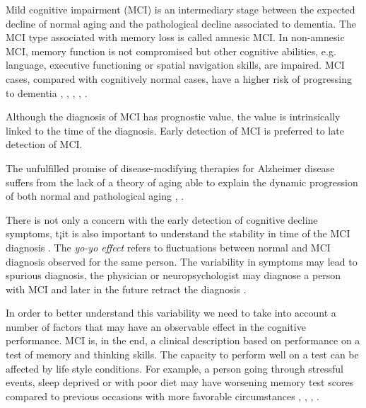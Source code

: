 \documentclass[preprint,12pt]{elsarticle}
\begin{document}
Mild cognitive impairment (MCI) is an intermediary stage between the expected decline of normal aging and the pathological decline associated to dementia. The MCI type associated with memory loss is called amnesic MCI. In non-amnesic MCI, memory function is not compromised but other cognitive abilities, e.g. language, executive functioning or spatial navigation skills, are impaired. MCI cases, compared with cognitively normal cases, have a higher risk of progressing to dementia \cite{flicker1991mild}, \cite{petersen1999mild}, \cite{bruscoli2004mci}, \cite{buratti2015markers}, \cite{michaud2017risk}.  
    
Although the diagnosis of MCI has prognostic value, the value is intrinsically linked to the time of the diagnosis. Early detection of MCI is preferred to late detection of MCI. 

The unfulfilled promise of disease-modifying therapies for Alzheimer disease suffers from the lack of a theory of aging able to explain the dynamic progression of both normal and pathological aging \cite{cerella1985information}, \cite{sleimen2014aging}. %

There is not only a concern with the early detection of cognitive decline symptoms, t¡it is also important to understand the stability in time of the MCI diagnosis \cite{}. The \emph{yo-yo effect} refers to fluctuations between normal and MCI diagnosis observed for the same person. The variability in symptoms may lead to spurious diagnosis, the physician or neuropsychologist may diagnose a person with MCI and later in the future retract the diagnosis \cite{https://www.ncbi.nlm.nih.gov/pubmed/24353338}. 

In order to better understand this variability we need to take into account a number of factors that may have an observable effect in the cognitive performance. MCI is, in the end, a clinical description based on performance on a test of memory and thinking skills. The capacity to perform well on a test can be affected by life style conditions. For example, a person going through stressful events, sleep deprived or with poor diet may have worsening memory test scores compared to previous occasions with more favorable circumstances \cite{http://learnmem.cshlp.org/content/22/4/197.full}, \cite{https://www.ncbi.nlm.nih.gov/pubmed/30076274}, \cite{https://www.ncbi.nlm.nih.gov/pmc/articles/PMC1950232/} , \cite{Daily stressors and memory failures in a naturalistic setting: Findings from the va normative aging study.}.
\end{document}

